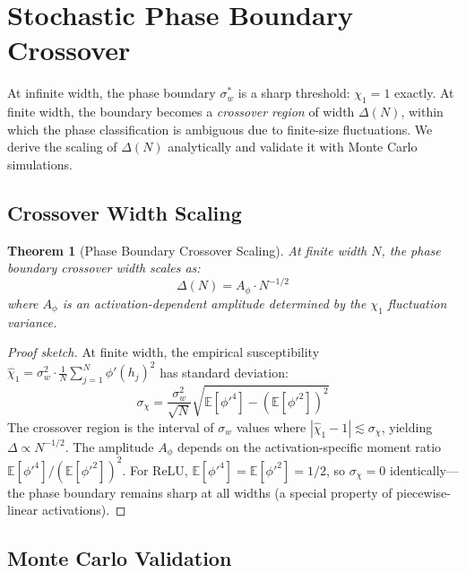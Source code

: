 \documentclass[10pt]{article}
\newcommand{\EE}{\mathbb{E}}
\newtheorem{theorem}{Theorem}
\begin{document}
\section{Stochastic Phase Boundary Crossover}
\label{sec:crossover}

At infinite width, the phase boundary $\sigma_w^*$ is a sharp threshold: $\chi_1 = 1$ exactly.
At finite width, the boundary becomes a \emph{crossover region} of width $\Delta(N)$, within which the phase classification is ambiguous due to finite-size fluctuations.
We derive the scaling of $\Delta(N)$ analytically and validate it with Monte Carlo simulations.

\subsection{Crossover Width Scaling}

\begin{theorem}[Phase Boundary Crossover Scaling]
\label{thm:crossover}
At finite width $N$, the phase boundary crossover width scales as:
\begin{equation}
    \Delta(N) = A_\phi \cdot N^{-1/2}
    \label{eq:crossover-scaling}
\end{equation}
where $A_\phi$ is an activation-dependent amplitude determined by the $\chi_1$ fluctuation variance.
\end{theorem}

\begin{proof}[Proof sketch]
At finite width, the empirical susceptibility $\hat{\chi}_1 = \sigma_w^2 \cdot \frac{1}{N}\sum_{j=1}^N \phi'(h_j)^2$ has standard deviation:
\begin{equation}
    \sigma_\chi = \frac{\sigma_w^2}{\sqrt{N}} \sqrt{\EE[\phi'^4] - (\EE[\phi'^2])^2}
    \label{eq:chi1-std}
\end{equation}
The crossover region is the interval of $\sigma_w$ values where $|\hat{\chi}_1 - 1| \lesssim \sigma_\chi$, yielding $\Delta \propto N^{-1/2}$.
The amplitude $A_\phi$ depends on the activation-specific moment ratio $\EE[\phi'^4]/(\EE[\phi'^2])^2$.
For ReLU, $\EE[\phi'^4] = \EE[\phi'^2] = 1/2$, so $\sigma_\chi = 0$ identically---the phase boundary remains sharp at all widths (a special property of piecewise-linear activations).
\end{proof}

\subsection{Monte Carlo Validation}
\end{document}
